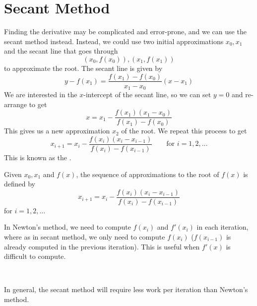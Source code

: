 \section{Secant Method}

Finding the derivative may be complicated and error-prone, and we can use the secant method instead. Instead, we could use two initial approximations \( x_0, x_1 \) and the secant line that goes through \[
    (x_0, f(x_0)), (x_1, f(x_1))
\] to approximate the root. The secant line is given by \[
    y - f(x_1) = \frac{f(x_1) - f(x_0)}{x_1 - x_0} (x - x_1)
\] We are interested in the \(x\)-intercept of the secant line, so we can set \( y = 0 \) and re-arrange to get \[
    x = x_1 - \frac{f(x_1)(x_1 - x_0)}{f(x_1) - f(x_0)}
\] This gives us a new approximation \( x_2 \) of the root. We repeat this process to get \[
    x_{i+1} = x_i - \frac{f(x_i)(x_i - x_{i-1})}{f(x_i) - f(x_{i-1})} \qquad \text{for } i = 1, 2, \dots
\] This is known as the .

\begin{definition}
    Given \( x_0, x_1 \) and \( f(x) \), the sequence of approximations to the root of \( f(x) \) is defined by \[
        x_{i+1} = x_i - \frac{f(x_i)(x_i - x_{i-1})}{f(x_i) - f(x_{i-1})}
    \] for \( i = 1, 2, \dots \)
\end{definition}

\begin{remark}
    In Newton's method, we need to compute \( f(x_i) \) and \( f'(x_i) \) in each iteration, where as in secant method, we only need to compute \( f(x_i) \) (\( f(x_{i-1}) \) is already computed in the previous iteration). This is useful when \( f'(x) \) is difficult to compute.

        {~~~}

    In general, the secant method will require less work per iteration than Newton's method.
\end{remark}

